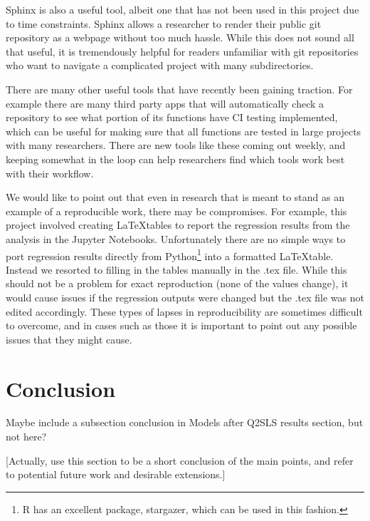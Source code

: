 \documentclass[12pt]{article}
\begin{document}
Sphinx is also a useful tool, albeit one that has not been used in this project due to time constraints. Sphinx allows a researcher to render their public git repository as a webpage without too much hassle. While this does not sound all that useful, it is tremendously helpful for readers unfamiliar with git repositories who want to navigate a complicated project with many subdirectories. 

There are many other useful tools that have recently been gaining traction. For example there are many third party apps that will automatically check a repository to see what portion of its functions have CI testing implemented, which can be useful for making sure that all functions are tested in large projects with many researchers. There are new tools like these coming out weekly, and keeping somewhat in the loop can help researchers find which tools work best with their workflow.

We would like to point out that even in research that is meant to stand as an example of a reproducible work, there may be compromises. For example, this project involved creating \LaTeX tables to report the regression results from the analysis in the Jupyter Notebooks. Unfortunately there are no simple ways to port regression results directly from Python\footnote{R has an excellent package, stargazer, which can be used in this fashion.} into a formatted \LaTeX table. Instead we resorted to filling in the tables manually in the .tex file. While this should not be a problem for exact reproduction (none of the values change), it would cause issues if the regression outputs were changed but the .tex file was not edited accordingly. These types of lapses in reproducibility are sometimes difficult to overcome, and in cases such as those it is important to point out any possible issues that they might cause.


\section{Conclusion}
Maybe include a subsection conclusion in Models after Q2SLS results section, but not here?

\textcolor{BlueGreen}{[Actually, use this section to be a short conclusion of the main points, and refer to potential future work and desirable extensions.]}

\newpage
\end{document}
